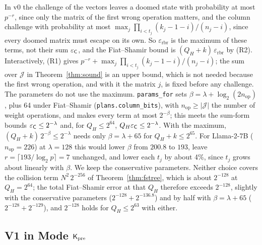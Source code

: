 \begin{remark}
\label{rem:rbr-max}
In v0 the challenge of the vectors leaves a doomed state with probability at most $p^{-r}$, since
only the matrix of the first wrong operation matters, and the column challenge with probability at
most $\max_j\prod_{i<t_j}(k_j-1-i)/(n_j-i)$, since every doomed matrix must escape on its own. So
$\varepsilon_{\mathrm{rbr}}$ is the maximum of these terms, not their sum $\varepsilon_{\mathsf{C}}$, and
the Fiat--Shamir bound is $(Q_H+k)\,\varepsilon_{\mathrm{rbr}}$ by (R2). Interactively, (R1) gives
$p^{-r}+\max_j\prod_{i<t_j}(k_j-1-i)/(n_j-i)$; the sum over $\mathcal J$ in
Theorem~\ref{thm:sound} is an upper bound, which is not needed because the first wrong operation,
and with it the matrix $j$, is fixed before any challenge.
The parameters do not use the maximum. \texttt{params\_for} sets
$\beta=\lambda+\log_2(2n_{\mathrm{op}})$, plus 64 under Fiat--Shamir (\texttt{plans.column\_bits}),
with $n_{\mathrm{op}}\ge|\mathcal J|$ the number of weight operations, and makes every term at most
$2^{-\beta}$; this meets the sum-form bounds $\varepsilon_{\mathsf{C}}\le2^{-\lambda}$ and, for
$Q_H\le2^{64}$, $Q_H\varepsilon_{\mathsf{C}}\le2^{-\lambda}$. With the maximum, $(Q_H+k)\,2^{-\beta}\le2^{-\lambda}$
needs only $\beta=\lambda+65$ for $Q_H+k\le2^{65}$. For Llama-2-7B ($n_{\mathrm{op}}=226$) at
$\lambda=128$ this would lower $\beta$ from $200.8$ to $193$, leave
$r=\lceil193/\log_2p\rceil=7$ unchanged, and lower each $t_j$ by about 4\%, since $t_j$ grows about
linearly with $\beta$. We keep the conservative parameters. Neither choice covers the collision term
$N^2\,2^{-256}$ of Theorem~\ref{thm:fstree}, which is about $2^{-128}$ at $Q_H=2^{64}$; the total
Fiat--Shamir error at that $Q_H$ therefore exceeds $2^{-128}$, slightly with the conservative
parameters ($2^{-128}+2^{-136.8}$) and by half with $\beta=\lambda+65$ ($2^{-128}+2^{-129}$), and
$2^{-128}$ holds for $Q_H\le2^{63}$ with either.
\end{remark}

\subsection{V1 in Mode \texorpdfstring{$\mathsf{K}_{\mathrm{pre}}$}{Kpre}}
\label{app:v1kpre}

